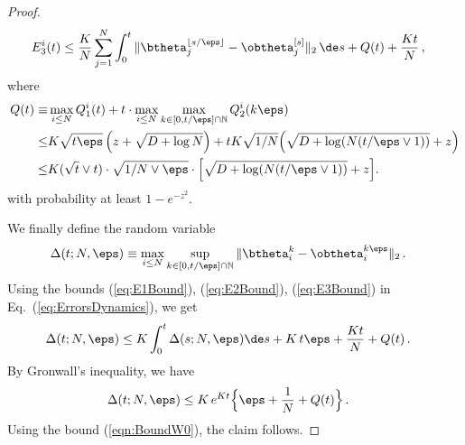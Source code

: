 \documentclass[11pt]{article}
\newtheorem{lemma}{Lemma}
\begin{document}
\begin{proof}
\begin{align}
E_3^i(t)& \le \frac{K}{N}\sum_{j=1}^N\int_0^t \|\btheta_j^{\lfloor s/\eps\rfloor}-\obtheta_j^{[s]}\|_2\, \de s+ Q(t)+\frac{Kt}{N}\, ,\label{eq:E3Bound}
\end{align}
where 
\begin{equation}\label{eqn:BoundW0}
\begin{aligned}
Q(t) \equiv & \max_{i \le N}Q_1^i(t)+t \cdot \max_{i \le N} \max_{k \in  [0, t/\eps] \cap \mathbb N}Q_2^i(k \eps) \\
\le& K\sqrt{t\eps}\, \Big( z + \sqrt{D + \log N}\Big) + t K \sqrt{1/N}\Big(\sqrt{D + \log(N (t/\eps \vee 1))}+z\Big)\\
\le& K(\sqrt{t} \vee t) \cdot \sqrt{1/N \vee \eps } \cdot \Big[\sqrt{D + \log (N (t/ \eps \vee 1))} + z \Big] . 
\end{aligned} 
\end{equation}
with probability at least $1 - e^{-z^2}$. 

We finally define the random variable
%
\begin{align}
\Delta(t;N,\eps) &\equiv \max_{i \le N}\sup_{k \in  [0, t/\eps] \cap \mathbb N}\|\btheta^{k}_i-\obtheta^{k\eps}_i\|_2\, .
\end{align}
%
Using  the bounds (\ref{eq:E1Bound}), (\ref{eq:E2Bound}), (\ref{eq:E3Bound}) in Eq.~(\ref{eq:ErrorsDynamics}), we get
%
\begin{align}
%
\Delta(t;N,\eps) &\le K\int_0^t\Delta(s;N,\eps) \de s+K\, t\eps+ \frac{Kt}{N} + Q(t)\,  .
%
\end{align}
%
By Gronwall's inequality, we have
%
%
\begin{align}
%
\Delta(t;N,\eps) &\le K \, e^{Kt}\Big\{\eps+ \frac{1}{N} +Q(t)\Big\}\,  .
%
\end{align}
%
Using the bound (\ref{eqn:BoundW0}), the claim follows.
\end{proof}


\end{document}

